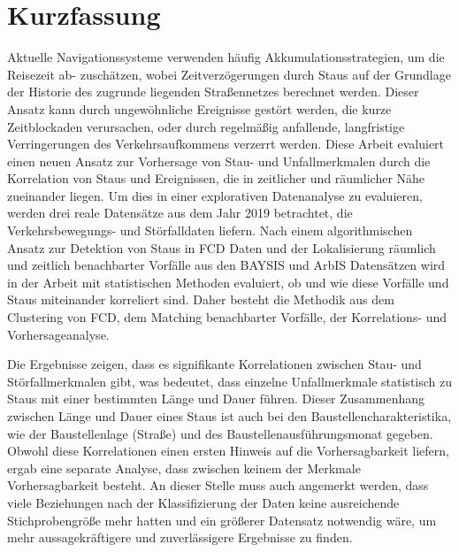 \cleardoubleoddpage

\chapter*{Kurzfassung}
\thispagestyle{empty} %
Aktuelle Navigationssysteme verwenden häufig Akkumulationsstrategien, um die Reisezeit ab- zuschätzen, wobei Zeitverzögerungen durch Staus auf der Grundlage der Historie des zugrunde liegenden Straßennetzes berechnet werden. Dieser Ansatz kann durch ungewöhnliche Ereignisse gestört werden, die kurze Zeitblockaden verursachen, oder durch regelmäßig anfallende, langfristige Verringerungen des Verkehrsaufkommens verzerrt werden. Diese Arbeit evaluiert einen neuen Ansatz zur Vorhersage von Stau- und Unfallmerkmalen durch die Korrelation von Staus und Ereignissen, die in zeitlicher und räumlicher Nähe zueinander liegen. Um dies in einer explorativen Datenanalyse zu evaluieren, werden drei reale Datensätze aus dem Jahr 2019 betrachtet, die Verkehrsbewegungs- und Störfalldaten liefern. Nach einem algorithmischen Ansatz zur Detektion von Staus in FCD Daten und der Lokalisierung räumlich und zeitlich benachbarter Vorfälle aus den BAYSIS und ArbIS Datensätzen wird in der Arbeit mit statistischen Methoden evaluiert, ob und wie diese Vorfälle und Staus miteinander korreliert sind. Daher besteht die Methodik aus dem Clustering von FCD, dem Matching benachbarter Vorfälle, der Korrelations- und Vorhersageanalyse.

Die Ergebnisse zeigen, dass es signifikante Korrelationen zwischen Stau- und Störfallmerkmalen gibt, was bedeutet, dass einzelne Unfallmerkmale statistisch zu Staus mit einer bestimmten Länge und Dauer führen. Dieser Zusammenhang zwischen Länge und Dauer eines Staus ist auch bei den Baustellencharakteristika, wie der Baustellenlage (Straße) und des Baustellenausführungsmonat gegeben. Obwohl diese Korrelationen einen ersten Hinweis auf die Vorhersagbarkeit liefern, ergab eine separate Analyse, dass zwischen keinem der Merkmale Vorhersagbarkeit besteht. An dieser Stelle muss auch angemerkt werden, dass viele Beziehungen nach der Klassifizierung der Daten keine ausreichende Stichprobengröße mehr hatten und ein größerer Datensatz notwendig wäre, um mehr aussagekräftigere und zuverlässigere Ergebnisse zu finden.